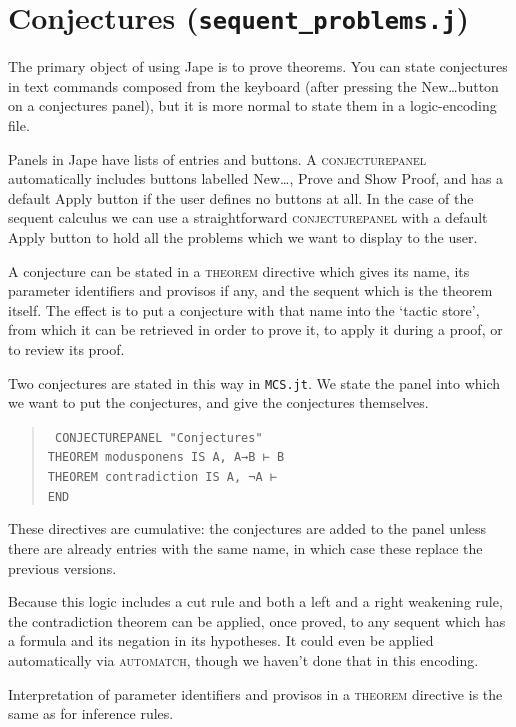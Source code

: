 \section{Conjectures (\texttt{sequent\_problems.j})}

The primary object of using Jape is to prove theorems. You can state conjectures in text commands composed from the keyboard (after pressing the New\dots button on a conjectures panel), but it is more normal to state them in a logic-encoding file.

Panels in Jape have lists of entries and buttons. A \textsc{conjecturepanel} automatically includes buttons labelled New\dots, Prove and Show Proof, and has a default Apply button if the user defines no buttons at all. In the case of the sequent calculus we can use a straightforward \textsc{conjecturepanel} with a default Apply button to hold all the problems which we want to display to the user. 

A conjecture can be stated in a \textsc{theorem} directive which gives its name, its parameter identifiers and provisos if any, and the sequent which is the theorem itself. The effect is to put a conjecture with that name into the `tactic store', from which it can be retrieved in order to prove it, to apply it during a proof, or to review its proof.

Two conjectures are stated in this way in \texttt{MCS.jt}. We state the panel into which we want to put the conjectures, and give the conjectures themselves. 
\begin{quote}\tt\small
CONJECTUREPANEL "Conjectures"\\
\tab THEOREM   modusponens IS A, A→B ⊢ B\\
\tab THEOREM   contradiction   IS A, ¬A ⊢ \\
END
\end{quote}
These directives are cumulative: the conjectures are added to the panel unless there are already entries with the same name, in which case these replace the previous versions.

Because this logic includes a cut rule and both a left and a right weakening rule, the contradiction theorem can be applied, once proved, to any sequent which has a formula and its negation in its hypotheses. It could even be applied automatically via \textsc{automatch}, though we haven't done that in this encoding.

Interpretation of parameter identifiers and provisos in a \textsc{theorem} directive is the same as for inference rules. 

